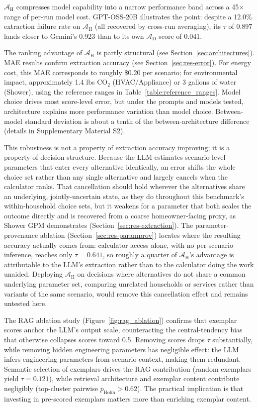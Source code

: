 \documentclass[a4paper,fleqn]{cas-dc}
\begin{document}
$\mathcal{A}_{\text{H}}$ compresses model capability into a narrow performance band across a 45$\times$ range of per-run model cost. GPT-OSS-20B illustrates the point: despite a 12.0\% extraction failure rate on $\mathcal{A}_{\text{H}}$ (all recovered by cross-run averaging), its $\tau$ of 0.897 lands closer to Gemini's 0.923 than to its own $\mathcal{A}_{\text{D}}$ score of 0.041.

The ranking advantage of $\mathcal{A}_{\text{H}}$ is partly structural (see Section~\ref{sec:architectures}). MAE results confirm extraction accuracy (see Section~\ref{sec:res-error}). For energy cost, this MAE corresponds to roughly \$0.20 per scenario; for environmental impact, approximately 1.4 lbs CO$_2$ (HVAC/Appliance) or 3 gallons of water (Shower), using the reference ranges in Table~\ref{table:reference_ranges}. Model choice drives most score-level error, but under the prompts and models tested, architecture explains more performance variation than model choice. Between-model standard deviation is about a tenth of the between-architecture difference (details in Supplementary Material S2).

This robustness is not a property of extraction accuracy improving; it is a property of decision structure. Because the LLM estimates scenario-level parameters that enter every alternative identically, an error shifts the whole choice set rather than any single alternative and largely cancels when the calculator ranks. That cancellation should hold wherever the alternatives share an underlying, jointly-uncertain state, as they do throughout this benchmark's within-household choice sets, but it weakens for a parameter that both scales the outcome directly and is recovered from a coarse homeowner-facing proxy, as Shower GPM demonstrates (Section~\ref{sec:res-extraction}). The parameter-provenance ablation (Section~\ref{sec:res-paramprov}) locates where the resulting accuracy actually comes from: calculator access alone, with no per-scenario inference, reaches only $\tau = 0.641$, so roughly a quarter of $\mathcal{A}_{\text{H}}$'s advantage is attributable to the LLM's extraction rather than to the calculator doing the work unaided. Deploying $\mathcal{A}_{\text{H}}$ on decisions where alternatives do not share a common underlying parameter set, comparing unrelated households or services rather than variants of the same scenario, would remove this cancellation effect and remains untested here.

The RAG ablation study (Figure~\ref{fig:rag_ablation}) confirms that exemplar scores anchor the LLM's output scale, counteracting the central-tendency bias that otherwise collapses scores toward 0.5. Removing scores drops $\tau$ substantially, while removing hidden engineering parameters has negligible effect: the LLM infers engineering parameters from scenario context, making them redundant. Semantic selection of exemplars drives the RAG contribution (random exemplars yield $\tau = 0.121$), while retrieval architecture and exemplar content contribute negligibly (top-cluster pairwise $p_{\text{Holm}} > 0.62$). The practical implication is that investing in pre-scored exemplars matters more than enriching exemplar content.
\end{document}
